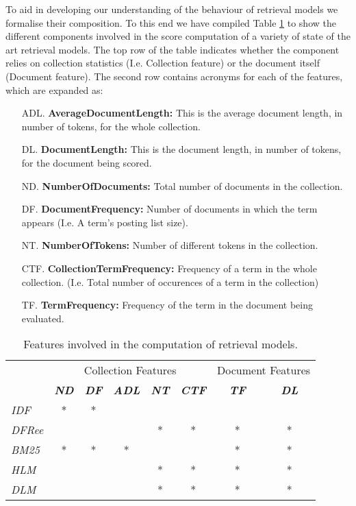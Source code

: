 To aid in developing our understanding of the behaviour of retrieval models we formalise their composition. To this end we have compiled Table \ref{modelfeatures} to show the different components involved in the score computation of a variety of state of the art retrieval models. The top row of the table indicates whether the component relies on collection statistics (I.e. Collection feature) or the document itself (Document feature). The second row contains acronyms for each of the features, which are expanded as: 

\begin{itemize}
\item [ADL.] \textbf{AverageDocumentLength:} This is the average document length, in number of tokens, for the whole collection.
\item [DL.] \textbf{DocumentLength:} This is the document length, in number of tokens, for the document being scored.
\item [ND.] \textbf{NumberOfDocuments:} Total number of documents in the collection. 
\item [DF.] \textbf{DocumentFrequency:} Number of documents in which the term appears (I.e. A term's posting list size).
\item [NT.] \textbf{NumberOfTokens:} Number of different tokens in the collection.
\item [CTF.] \textbf{CollectionTermFrequency:} Frequency of a term in the whole collection. (I.e. Total number of occurences of a term in the collection)
\item [TF.] \textbf{TermFrequency:} Frequency of the term in the document being evaluated.
\end{itemize}

\begin{table}[]
	\caption{Features involved in the computation of retrieval models.}
	\centering
	\begin{tabular}{|l|c|c|c|c|c||c|c|} 
		\cline{2- 8}
		\multicolumn{1}{c|}{}& \multicolumn{5}{c||}{Collection Features} &  \multicolumn{2}{c|}{Document Features} \tabularnewline
		\cline{2- 8}
		\multicolumn{1}{c|}{}
		& \textit{\textbf{ND} } & \textit{\textbf{DF} } & \textit{\textbf{ADL} } & \textit{\textbf{NT} } 
		& \textit{\textbf{CTF} } & \textit{\textbf{TF} } & \textit{\textbf{DL} } \tabularnewline \hline
		\textit{IDF} 	& * &  *&  	&   &  	&	&   \tabularnewline \hline
		\textit{DFRee} 	&   &   &   & * & * &*	&* \tabularnewline \hline
		\textit{BM25}	& * &  *& * &   &  	&*	&* \tabularnewline \hline
		\textit{HLM} 	&   &   &  	& * & * &*	&* \tabularnewline \hline
		\textit{DLM} 	&   &   &  	& * & * &*	&* \tabularnewline \hline
	\end{tabular}
	\label{modelfeatures}
\end{table}

